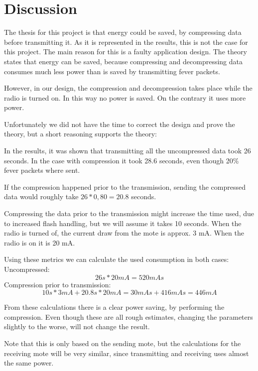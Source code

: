 \chapter{Discussion}


The thesis for this project is that energy could be saved, by compressing data before transmitting it. As it is represented in the results, this is not the case for this project. The main reason for this is a faulty application design. 
The theory states that energy can be saved, because compressing and decompressing data consumes much less power than is saved by transmitting fever packets.

However, in our design, the compression and decompression takes place while the radio is turned on. In this way no power is saved. On the contrary it uses more power.

Unfortunately we did not have the time to correct the design and prove the theory, but a short reasoning supports the theory:


In the results, it was shown that transmitting all the uncompressed data took 26 seconds. In the case with compression it took 28.6 seconds, even though 20\% fever packets where sent. 

If the compression happened prior to the transmission, sending the compressed data would roughly take $26*0,80 = 20.8$ seconds. 

Compressing the data prior to the transmission might increase the time used, due to increased flash handling, but we will assume it takes 10 seconds.
When the radio is turned of, the current draw from the mote is approx. 3 mA. When the radio is on it is 20 mA. 

Using these metrics we can calculate the used consumption in both cases:\\
Uncompressed:
\begin{equation}
26 s * 20 mA = 520 mAs
\end{equation}
Compression prior to transmission:
\begin{equation}
10 s * 3 mA + 20.8 s * 20 mA = 30 mAs + 416 mAs  = 446 mA
\end{equation}

From these calculations there is a clear power saving, by performing the compression. Even though these are all rough estimates, changing the parameters slightly to the worse, will not change the result.

Note that this is only based on the sending mote, but the calculations for the receiving mote will be very similar, since transmitting and receiving uses almost the same power.

